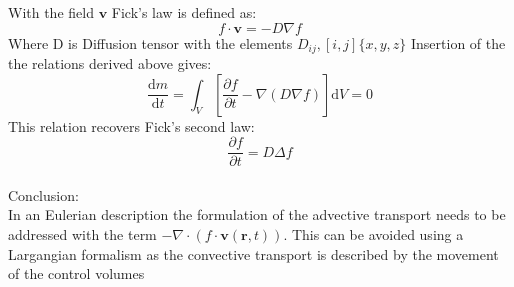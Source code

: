 \documentclass[hyperref]{labbook}
\numberwithin{equation}{experiment}
\numberwithin{table}{experiment}
\numberwithin{figure}{experiment}
\begin{document}
With the  field $\mathbf{v}$ Fick's law is defined as:
\begin{equation}
f \cdot \mathbf{v} = -{D} \nabla f
\end{equation}
Where D is Diffusion tensor with the elements $D_{ij} ,[i,j]  \{x,y,z\}$
Insertion of the the relations derived above gives: 
\begin{equation}
\frac{\mathrm{d}m}{\mathrm{d}t}  = \int_V \left[ \frac{\partial f }{\partial t } - \nabla (D\nabla f) \right]\mathrm{d}V = 0
\end{equation}
This relation recovers Fick's second law:
\begin{equation}
\frac{\partial f}{\partial t} = D \Delta f
\end{equation}\\[1em]
Conclusion: \\
In an Eulerian description the formulation of the advective transport needs to be addressed with the term $ - \nabla \cdot (f \cdot \mathbf{v}(\mathbf{r},t))$. This can be avoided using a Largangian formalism as the convective transport is described by the movement of the control volumes  
 
\end{document}
